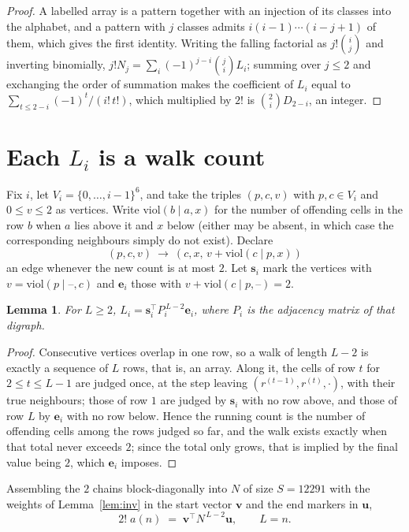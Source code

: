 \documentclass[11pt,a4paper]{article}
\theoremstyle{plain}
\newtheorem{lemma}[theorem]{Lemma}
\theoremstyle{definition}
\begin{document}
\begin{proof}
A labelled array is a pattern together with an injection of its classes into the alphabet,
and a pattern with $j$ classes admits $i(i-1)\cdots(i-j+1)$ of them, which gives the first
identity. Writing the falling factorial as $j!\binom{i}{j}$ and inverting binomially,
$j!N_j=\sum_i(-1)^{j-i}\binom{j}{i}L_i$; summing over $j\le2$ and exchanging the
order of summation makes the coefficient of $L_i$ equal to
$\sum_{t\le2-i}(-1)^t/(i!\,t!)$, which multiplied by $2!$ is
$\binom{2}{i}D_{2-i}$, an integer.
\end{proof}

\section{Each $L_i$ is a walk count}

Fix $i$, let $V_i=\{0,\dots,i-1\}^{6}$, and take the triples $(p,c,v)$ with
$p,c\in V_i$ and $0\le v\le2$ as vertices. Write $\mathrm{viol}(b\mid a,x)$ for the number
of offending cells in the row $b$ when $a$ lies above it and $x$ below (either may be
absent, in which case the corresponding neighbours simply do not exist). Declare
\[
(p,c,v)\ \longrightarrow\ (c,x,\,v+\mathrm{viol}(c\mid p,x))
\]
an edge whenever the new count is at most $2$. Let $\mathbf{s}_i$ mark the vertices with
$v=\mathrm{viol}(p\mid\text{--},c)$ and $\mathbf{e}_i$ those with
$v+\mathrm{viol}(c\mid p,\text{--})=2$.

\begin{lemma}\label{lem:walk}
For $L\ge2$, $L_i=\mathbf{s}_i^{\!\top}P_i^{\,L-2}\mathbf{e}_i$, where $P_i$ is the
adjacency matrix of that digraph.
\end{lemma}

\begin{proof}
Consecutive vertices overlap in one row, so a walk of length $L-2$ is exactly a sequence
of $L$ rows, that is, an array. Along it, the cells of row $t$ for $2\le t\le L-1$ are
judged once, at the step leaving $(r^{(t-1)},r^{(t)},\cdot)$, with their true neighbours;
those of row $1$ are judged by $\mathbf{s}_i$ with no row above, and those of row
$L$ by $\mathbf{e}_i$ with no row below. Hence the running count is the number of
offending cells among the rows judged so far, and the walk exists exactly when that total
never exceeds $2$; since the total only grows, that is implied by the final value being
$2$, which $\mathbf{e}_i$ imposes.
\end{proof}

Assembling the $2$ chains block-diagonally into $N$ of size $S=12291$ with the weights of
Lemma~\ref{lem:inv} in the start vector $\mathbf{v}$ and the end markers in
$\mathbf{u}$,
\begin{equation}\label{eq:walk2}
2!\;a(n)\;=\;\mathbf{v}^{\!\top}N^{\,L-2}\mathbf{u},\qquad L=n .
\end{equation}
\end{document}
